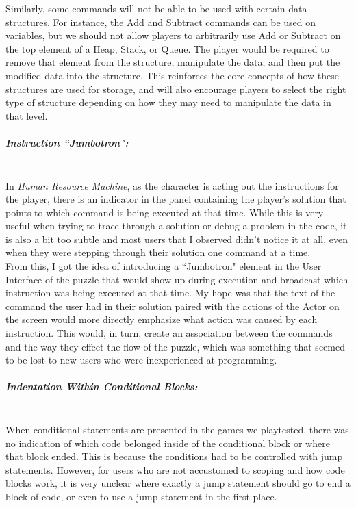 Similarly, some commands will not be able to be used with certain data structures. For instance, the Add and Subtract
commands can be used on variables, but we should not allow players to arbitrarily use Add or Subtract on the
top element of a Heap, Stack, or Queue. The player would be required to remove that element from the structure,
manipulate the data, and then put the modified data into the structure. This reinforces the core concepts of how
these structures are used for storage, and will also encourage players to select the right type of structure depending
on how they may need to manipulate the data in that level.\\

\subparagraph{Instruction ``Jumbotron":}\mbox{} \\
In \textit{Human Resource Machine}, as the character is acting out the instructions for the player, there is an indicator
in the panel containing the player's solution that points to which command is being executed at that time. While this
is very useful when trying to trace through a solution or debug a problem in the code, it is also a bit too subtle
and most users that I observed didn't notice it at all, even when they were stepping through their solution one
command at a time.\\

From this, I got the idea of introducing a ``Jumbotron" element in the User Interface of the puzzle that would
show up during execution and broadcast which instruction was being executed at that time. My hope was that the
text of the command the user had in their solution paired with the actions of the Actor on the screen would more
directly emphasize what action was caused by each instruction. This would, in turn, create an association between 
the commands and the way they effect the flow of the puzzle, which was something that seemed to be lost to new users
who were inexperienced at programming.\\

\subparagraph{Indentation Within Conditional Blocks:}\mbox{} \\
When conditional statements are presented in the games we playtested, there was no indication of which code
belonged inside of the conditional block or where that block ended. This is because the conditions had to be
controlled with jump statements. However, for users who are not accustomed to scoping and how code blocks
work, it is very unclear where exactly a jump statement should go to end a block of code, or even to use a jump
statement in the first place.\\

